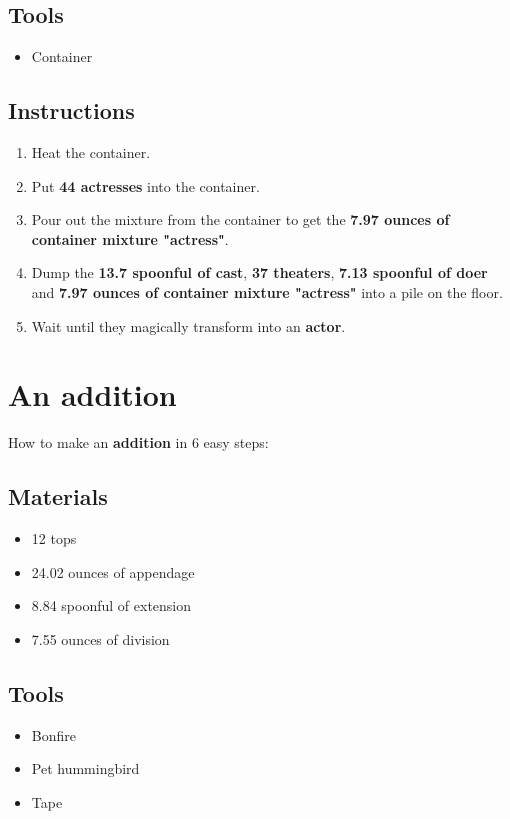\documentclass{article}
\begin{document}
\subsection{Tools}\begin{itemize}
\item 
Container
\end{itemize}
\subsection{Instructions}\begin{enumerate}
\item 
Heat the container.
\item 
Put \textbf{44 actresses} into the container.
\item 
Pour out the mixture from the container to get the \textbf{7.97 ounces of container mixture "actress"}.
\item 
Dump the \textbf{13.7 spoonful of cast}, \textbf{37 theaters}, \textbf{7.13 spoonful of doer} and \textbf{7.97 ounces of container mixture "actress"} into a pile on the floor.
\item 
Wait until they magically transform into an \textbf{actor}.
\end{enumerate}
\newpage
\section{An addition}How to make an \textbf{addition} in 6 easy steps:

\subsection{Materials}\begin{itemize}
\item 
12 tops
\item 
24.02 ounces of appendage
\item 
8.84 spoonful of extension
\item 
7.55 ounces of division
\end{itemize}
\subsection{Tools}\begin{itemize}
\item 
Bonfire
\item 
Pet hummingbird
\item 
Tape
\end{itemize}
\end{document}
